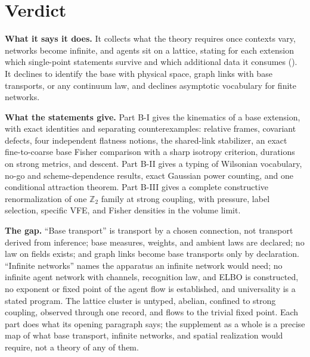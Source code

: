 \section{Verdict}
\label{comp:sb-verdict}

\begin{verdictbox}{\NARROWER}
\textbf{What it says it does.} It collects what the theory requires once contexts vary, networks become
infinite, and agents sit on a lattice, stating for each extension which single-point statements survive and
which additional data it consumes (). It declines to identify the base with physical
space, graph links with base transports, or any continuum law, and declines asymptotic vocabulary for finite
networks.

\textbf{What the statements give.} Part B-I gives the kinematics of a base extension, with exact
identities and separating counterexamples: relative frames, covariant defects, four independent flatness
notions, the shared-link stabilizer, an exact fine-to-coarse base Fisher comparison with a sharp isotropy
criterion, durations on strong metrics, and descent. Part B-II gives a typing of Wilsonian vocabulary, no-go
and scheme-dependence results, exact Gaussian power counting, and one conditional attraction theorem. Part
B-III gives a complete constructive renormalization of one \(\mathbb Z_2\) family at strong coupling, with
pressure, label selection, specific VFE, and Fisher densities in the volume limit.

\textbf{The gap.} ``Base transport'' is transport by a chosen connection, not transport derived from
inference; base measures, weights, and ambient laws are declared; no law on fields exists; and graph links
become base transports only by declaration. ``Infinite networks'' names the apparatus an infinite network
would need; no infinite agent network with channels, recognition law, and ELBO is constructed, no exponent or
fixed point of the agent flow is established, and universality is a stated program. The lattice cluster is
untyped, abelian, confined to strong coupling, observed through one record, and flows to the trivial fixed
point. Each part does what its opening paragraph says; the supplement as a whole is a precise map of what base
transport, infinite networks, and spatial realization would require, not a theory of any of them.
\end{verdictbox}
